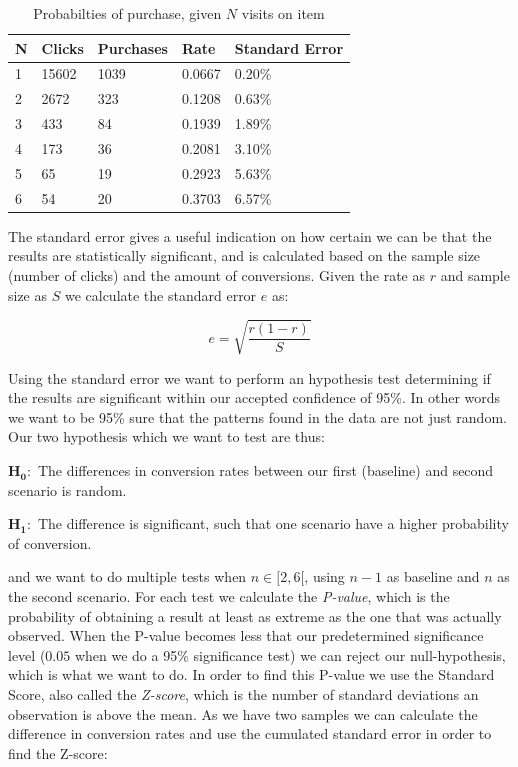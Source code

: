 \begin{table}[H]
  \centering
  \begin{tabular}{lllll}
    \toprule
    N & Clicks & Purchases & Rate & Standard Error \\
    \midrule
    1 & 15602 & 1039  & 0.0667 & 0.20\% \\
    2 & 2672  & 323   & 0.1208 & 0.63\% \\
    3 & 433   & 84    & 0.1939 & 1.89\% \\
    4 & 173   & 36    & 0.2081 & 3.10\% \\
    5 & 65    & 19    & 0.2923 & 5.63\% \\
    6 & 54    & 20    & 0.3703 & 6.57\% \\
    \bottomrule
  \end{tabular}
  \label{tab:prob-purchase}
  \caption{Probabilties of purchase, given $N$ visits on item}
\end{table}

The standard error gives a useful indication on how certain we can be that the
results are statistically significant, and is calculated based on the sample
size (number of clicks) and the amount of conversions. Given the rate as $r$
and sample size as $S$ we calculate the standard error $e$ as:

\begin{equation}
  e = \sqrt{\frac{r(1 - r)}{S}}
\end{equation}

Using the standard error we want to perform an hypothesis test determining if
the results are significant within our accepted confidence of 95\%. In other
words we want to be 95\% sure that the patterns found in the data are not just
random. Our two hypothesis which we want to test are thus:

$\mathbf{H_0:}$ The differences in conversion rates between our first
(baseline) and second scenario is random.

$\mathbf{H_1:}$ The difference is significant, such that one scenario have a
higher probability of conversion.

and we want to do multiple tests when $n \in [2,6[$, using $n-1$ as baseline
and $n$ as the second scenario. For each test we calculate the
\textit{P-value}, which is the probability of obtaining a result at least as
extreme as the one that was actually observed. When the P-value becomes less
that our predetermined significance level ($0.05$ when we do a 95\%
significance test) we can reject our null-hypothesis, which is what we want to
do. In order to find this P-value we use the Standard Score, also called the
\textit{Z-score}, which is the number of standard deviations an observation is
above the mean. As we have two samples we can calculate the difference in
conversion rates and use the cumulated standard error in order to find the
Z-score:

